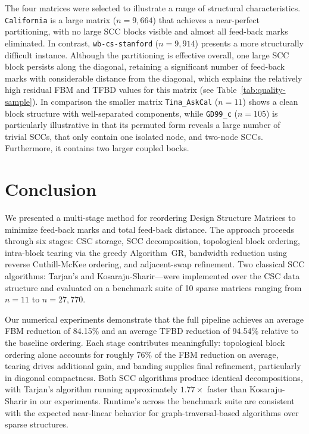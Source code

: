 \documentclass[12pt]{article}
\theoremstyle{definition}
\begin{document}
The four matrices were selected to illustrate a range of structural 
characteristics. \texttt{California} is a large matrix ($n = 9{,}664$) that achieves a near-perfect partitioning, with no large SCC blocks visible and almost all feed-back marks eliminated. In contrast, \texttt{wb-cs-stanford} ($n = 9{,}914$) presents a more structurally difficult instance. Although the partitioning is effective overall, one large SCC block persists along the diagonal, retaining a significant number of feed-back marks with considerable distance from the diagonal, which explains the relatively high residual FBM and TFBD values for this matrix (see Table~\ref{tab:quality-sample}). In comparison the smaller matrix \texttt{Tina\_AskCal} ($n = 11$) shows a clean block structure with well-separated components, while \texttt{GD99\_c} ($n = 105$) is particularly illustrative in that its permuted form reveals a large number of trivial SCCs, that only contain one isolated node, and two-node SCCs. Furthermore, it contains two larger coupled bocks.


\section{Conclusion}\label{sec:conclusion}

We presented a multi-stage method for reordering Design Structure Matrices to minimize feed-back marks and total feed-back distance. The approach proceeds through six stages: CSC storage, SCC decomposition, topological block ordering, intra-block tearing via the greedy Algorithm~GR, bandwidth reduction using reverse Cuthill-McKee ordering, and adjacent-swap refinement. Two classical SCC algorithms: Tarjan's and Kosaraju-Sharir---were implemented over the CSC data structure and evaluated on a benchmark suite of 10 sparse matrices ranging from $n=11$ to $n=27{,}770$.

Our numerical experiments demonstrate that the full pipeline achieves an average FBM reduction of 84.15\% and an average TFBD reduction of 94.54\% relative to the baseline ordering. Each stage contributes meaningfully: topological block ordering alone accounts for roughly 76\% of the FBM reduction on average, tearing drives additional gain, and banding supplies final refinement, particularly in diagonal compactness. Both SCC algorithms produce identical decompositions, with Tarjan's algorithm running approximately $1.77\times$ faster than Kosaraju-Sharir in our experiments. Runtime's across the benchmark suite are consistent with the expected near-linear behavior for graph-traversal-based algorithms over sparse structures.
\end{document}
